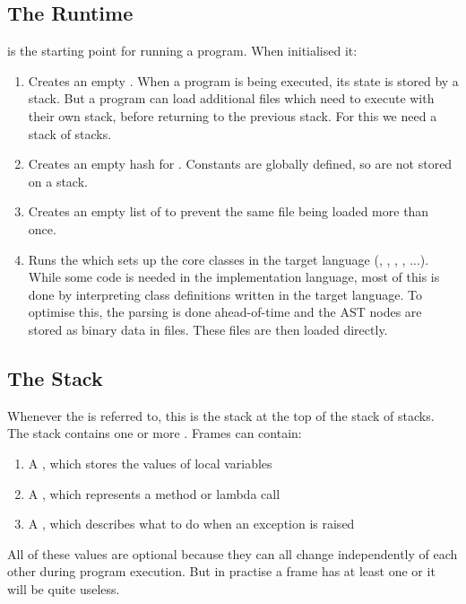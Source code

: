 \subsection{The Runtime}

 is the starting point for running a program. When initialised it:

\begin{enumerate}
  \item Creates an empty . When a program is being executed, its state is stored by a stack. But a program can load additional files which need to execute with their own stack, before returning to the previous stack. For this we need a stack of stacks.
  \item Creates an empty hash for . Constants are globally defined, so are not stored on a stack.
  \item Creates an empty list of  to prevent the same file being loaded more than once.
  \item Runs the  which sets up the core classes in the target language (, , , , ...). While some code is needed in the implementation language, most of this is done by interpreting class definitions written in the target language. To optimise this, the parsing is done ahead-of-time and the AST nodes are stored as binary data in files. These files are then loaded directly.
\end{enumerate}

\subsection{The Stack}

Whenever the  is referred to, this is the stack at the top of the stack of stacks. The stack contains one or more . Frames can contain:

\begin{enumerate}
  \item A , which stores the values of local variables
  \item A , which represents a method or lambda call
  \item A , which describes what to do when an exception is raised
\end{enumerate}

All of these values are optional because they can all change independently of each other during program execution. But in practise a frame has at least one or it will be quite useless.

